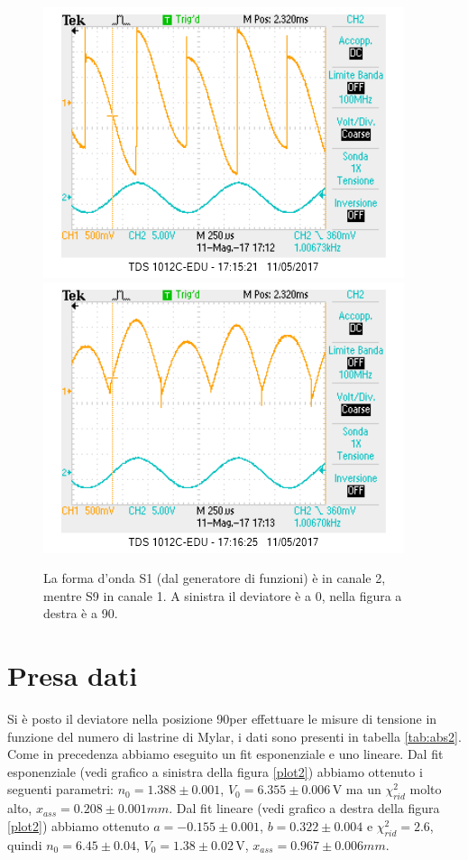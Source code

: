 \documentclass[10pt,a4paper]{article}
\begin{document}
\begin{figure}[!htb]
  \centering
  \includegraphics[scale=0.45]{dev0ch1S9-ch2S1(zero).png}\includegraphics[scale=0.45]{dev90ch1S9-ch2S1(zero).png}
\caption{La forma d'onda S1 (dal generatore di funzioni) è in canale 2, mentre S9 in canale 1. A sinistra il deviatore è a 0\degree, nella figura a destra è a 90\degree. \label{osc:devS9}}
\end{figure}

\section{Presa dati}
Si è posto il deviatore nella posizione 90\degree per effettuare le misure di tensione in funzione del numero di lastrine di Mylar, i dati sono presenti in tabella \ref{tab:abs2}. Come in precedenza abbiamo eseguito un fit esponenziale e uno lineare. Dal fit esponenziale (vedi grafico a sinistra della figura \ref{plot2}) abbiamo ottenuto i seguenti parametri: $n_0= 1.388\pm 0.001$, $V_0=6.355\pm0.006\,\mbox{V}$ ma un $\chi^2_{rid}$ molto alto, $x_{ass}=0.208\pm0.001{mm}$. Dal fit lineare (vedi grafico a destra della figura \ref{plot2}) abbiamo ottenuto $a=-0.155\pm0.001$, $b=0.322\pm0.004$ e $\chi^2_{rid}=2.6$, quindi $n_0= 6.45\pm 0.04$, $V_0=1.38\pm0.02\,\mbox{V}$, $x_{ass}=0.967\pm0.006{mm}$.
\end{document}
